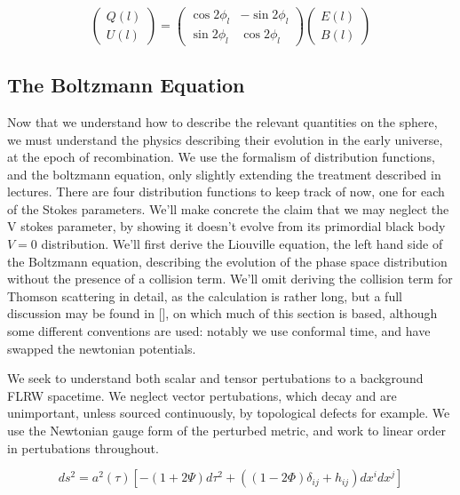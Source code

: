 \documentclass[a4paper,11pt]{article}
\begin{document}
\begin{equation}
\begin{pmatrix}
Q(l)\\
U(l) 
\end{pmatrix}
=
\begin{pmatrix}
\cos{2\phi_l} & -\sin{2\phi_l}\\ 
\sin{2\phi_l} & \cos{2\phi_l}
\end{pmatrix}
\begin{pmatrix}
E(l)\\
B(l) 
\end{pmatrix}
\end{equation}

\subsection{The Boltzmann Equation}

Now that we understand how to describe the relevant quantities on the sphere, we must understand the physics describing their evolution in the early universe, at the epoch of recombination. We use the formalism of distribution functions, and the boltzmann equation, only slightly extending the treatment described in lectures. There are four distribution functions to keep track of now, one for each of the Stokes parameters. We'll make concrete the claim that we may neglect the V stokes parameter, by showing it doesn't evolve from its primordial black body $V=0$ distribution. We'll first derive the Liouville equation, the left hand side of the Boltzmann equation, describing the evolution of the phase space distribution without the presence of a collision term. We'll omit deriving the collision term for Thomson scattering in detail, as the calculation is rather long, but a full discussion may be found in [], on which much of this section is based, although some different conventions are used: notably we use conformal time, and have swapped the newtonian potentials.

We seek to understand both scalar and tensor pertubations to a background FLRW spacetime. We neglect vector pertubations, which decay and are unimportant, unless sourced continuously, by topological defects for example. We use the Newtonian gauge form of the perturbed metric, and work to linear order in pertubations throughout.

\begin{equation}
ds^2 = a^2(\tau) [-(1+2\Psi)d\tau^2 + ((1-2\Phi)\delta_{ij} +h_{ij})dx^idx^j]
\label{perturbmetric}
\end{equation}
\end{document}
